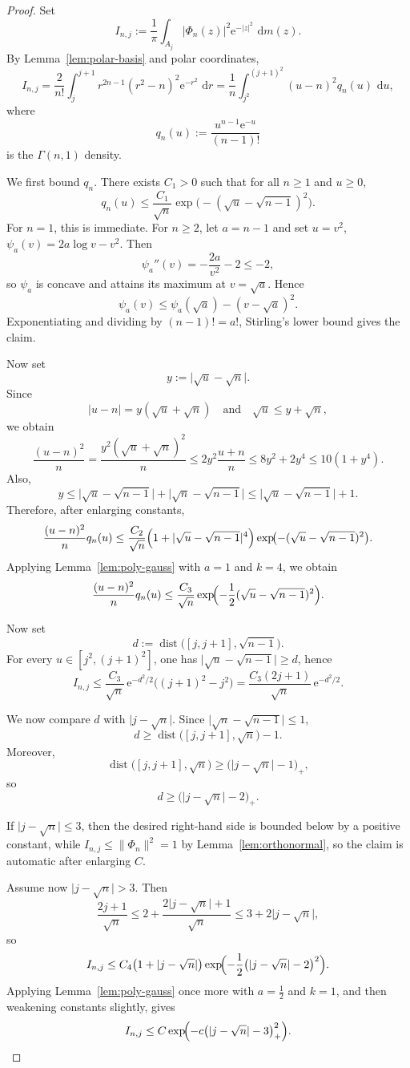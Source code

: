 \documentclass[11pt]{amsart}
\theoremstyle{remark}
\newcommand{\abs}[1]{\lvert #1 \rvert}
\newcommand{\norm}[1]{\lVert #1 \rVert}
\newcommand{\dd}{\,\mathrm{d}}
\newcommand{\ee}{\mathrm{e}}
\DeclareMathOperator{\dist}{dist}
\begin{document}
\begin{proof}
Set
\[
I_{n,j}
:=
\frac1\pi \int_{A_j} \abs{\Phi_n(z)}^2 \ee^{-\abs{z}^2}\,\dd m(z).
\]
By Lemma~\ref{lem:polar-basis} and polar coordinates,
\[
I_{n,j}
=
\frac{2}{n!}\int_j^{j+1} r^{2n-1}(r^2-n)^2 \ee^{-r^2}\,\dd r
=
\frac1n \int_{j^2}^{(j+1)^2} (u-n)^2 q_n(u)\,\dd u,
\]
where
\[
q_n(u) := \frac{u^{n-1}\ee^{-u}}{(n-1)!}
\]
is the $\Gamma(n,1)$ density.

We first bound $q_n$. There exists $C_1>0$ such that for all $n \ge 1$ and
$u \ge 0$,
\[
q_n(u)
\le
\frac{C_1}{\sqrt n}
\exp\!\bigl(-(\sqrt u - \sqrt{n-1})^2\bigr).
\]
For $n=1$, this is immediate. For $n \ge 2$, let $a=n-1$ and set
$u=v^2$, $\psi_a(v)=2a\log v - v^2$. Then
\[
\psi_a''(v) = -\frac{2a}{v^2} - 2 \le -2,
\]
so $\psi_a$ is concave and attains its maximum at $v=\sqrt a$. Hence
\[
\psi_a(v) \le \psi_a(\sqrt a) - (v-\sqrt a)^2.
\]
Exponentiating and dividing by $(n-1)! = a!$, Stirling's lower bound gives the
claim.

Now set
\[
y := \abs{\sqrt u - \sqrt n}.
\]
Since
\[
\abs{u-n} = y(\sqrt u + \sqrt n)
\quad \text{and} \quad
\sqrt u \le y + \sqrt n,
\]
we obtain
\[
\frac{(u-n)^2}{n}
=
\frac{y^2(\sqrt u + \sqrt n)^2}{n}
\le
2y^2 \frac{u+n}{n}
\le
8y^2 + 2y^4
\le
10(1+y^4).
\]
Also,
\[
y
\le
\abs{\sqrt u - \sqrt{n-1}} + \abs{\sqrt n - \sqrt{n-1}}
\le
\abs{\sqrt u - \sqrt{n-1}} + 1.
\]
Therefore, after enlarging constants,
\[
\frac{(u-n)^2}{n}q_n(u)
\le
\frac{C_2}{\sqrt n}
\Bigl(1 + \abs{\sqrt u - \sqrt{n-1}}^4\Bigr)
\exp\!\bigl(-(\sqrt u - \sqrt{n-1})^2\bigr).
\]
Applying Lemma~\ref{lem:poly-gauss} with $a=1$ and $k=4$, we obtain
\[
\frac{(u-n)^2}{n}q_n(u)
\le
\frac{C_3}{\sqrt n}
\exp\!\Bigl(-\frac12(\sqrt u - \sqrt{n-1})^2\Bigr).
\]

Now set
\[
d := \dist\bigl([j,j+1],\sqrt{n-1}\bigr).
\]
For every $u \in [j^2,(j+1)^2]$, one has
$\abs{\sqrt u - \sqrt{n-1}} \ge d$, hence
\[
I_{n,j}
\le
\frac{C_3}{\sqrt n}\,\ee^{-d^2/2}\bigl((j+1)^2 - j^2\bigr)
=
\frac{C_3(2j+1)}{\sqrt n}\,\ee^{-d^2/2}.
\]

We now compare $d$ with $\abs{j-\sqrt n}$. Since
$\abs{\sqrt n - \sqrt{n-1}} \le 1$,
\[
d
\ge
\dist\bigl([j,j+1],\sqrt n\bigr) - 1.
\]
Moreover,
\[
\dist\bigl([j,j+1],\sqrt n\bigr)
\ge
\bigl(\abs{j-\sqrt n}-1\bigr)_+,
\]
so
\[
d \ge \bigl(\abs{j-\sqrt n}-2\bigr)_+.
\]

If $\abs{j-\sqrt n}\le 3$, then the desired right-hand side is bounded below
by a positive constant, while $I_{n,j}\le\norm{\Phi_n}^2=1$ by
Lemma~\ref{lem:orthonormal}, so the claim is automatic after enlarging $C$.

Assume now $\abs{j-\sqrt n}>3$. Then
\[
\frac{2j+1}{\sqrt n}
\le
2 + \frac{2\abs{j-\sqrt n}+1}{\sqrt n}
\le
3 + 2\abs{j-\sqrt n},
\]
so
\[
I_{n,j}
\le
C_4\bigl(1+\abs{j-\sqrt n}\bigr)
\exp\!\Bigl(-\frac12\bigl(\abs{j-\sqrt n}-2\bigr)^2\Bigr).
\]
Applying Lemma~\ref{lem:poly-gauss} once more with $a=\frac12$ and $k=1$,
and then weakening constants slightly, gives
\[
I_{n,j}
\le
C \exp\!\Bigl(-c\bigl(\abs{j-\sqrt n}-3\bigr)_+^2\Bigr).
\qedhere
\]
\end{proof}
\end{document}
